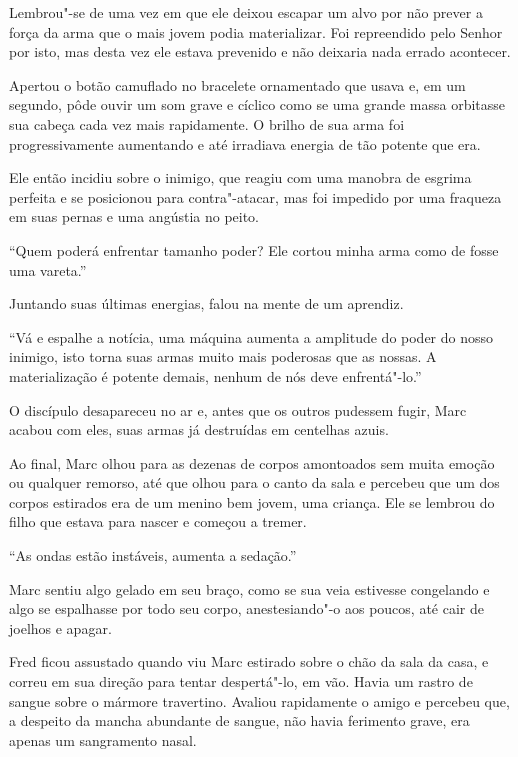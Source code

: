 Lembrou"-se de uma vez em que ele deixou escapar um alvo por não prever a força
da arma que o mais jovem podia materializar. Foi repreendido pelo Senhor
 por isto, mas desta vez ele estava prevenido e não deixaria nada
errado acontecer.

Apertou o botão camuflado no bracelete ornamentado que usava e, em um
segundo, pôde ouvir um som grave e cíclico como se uma grande massa
orbitasse sua cabeça cada vez mais rapidamente. O brilho de sua arma foi
progressivamente aumentando e até irradiava energia de tão potente que
era.

Ele então incidiu sobre o inimigo, que reagiu com uma manobra de esgrima
perfeita e se posicionou para contra"-atacar, mas foi impedido por uma
fraqueza em suas pernas e uma angústia no peito.

``Quem poderá enfrentar tamanho poder? Ele cortou minha arma como de
fosse uma vareta.''

Juntando suas últimas energias, falou na mente de um aprendiz.

``Vá e espalhe a notícia, uma máquina aumenta a amplitude do poder do
nosso inimigo, isto torna suas armas muito mais poderosas que as nossas.
A materialização é potente demais, nenhum de nós deve enfrentá"-lo.''

O discípulo desapareceu no ar e, antes que os outros pudessem fugir,
Marc acabou com eles, suas armas já destruídas em centelhas azuis.

Ao final, Marc olhou para as dezenas de corpos amontoados sem muita
emoção ou qualquer remorso, até que olhou para o canto da sala e
percebeu que um dos corpos estirados era de um menino bem jovem, uma
criança. Ele se lembrou do filho que estava para nascer e começou a
tremer.

``As ondas estão instáveis, aumenta a sedação.''

Marc sentiu algo gelado em seu braço, como se sua veia estivesse
congelando e algo se espalhasse por todo seu corpo, anestesiando"-o aos
poucos, até cair de joelhos e apagar.

\asterisc


Fred ficou assustado quando viu Marc estirado sobre o chão da sala da
casa, e correu em sua direção para tentar despertá"-lo, em vão. Havia um rastro
de sangue sobre o mármore travertino. Avaliou rapidamente o amigo e
percebeu que, a despeito da mancha abundante de sangue, não havia
ferimento grave, era apenas um sangramento nasal.

